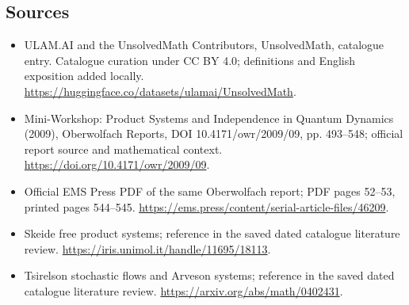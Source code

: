 \documentclass[11pt]{article}
\begin{document}
\subsection{Sources}
\begin{itemize}
\item[\hypertarget{source:statement:1}{S1}] ULAM.AI and the UnsolvedMath Contributors, UnsolvedMath, catalogue entry. Catalogue curation under CC BY 4.0; definitions and English exposition added locally.
\url{https://huggingface.co/datasets/ulamai/UnsolvedMath}.
\item[\hypertarget{source:statement:2}{S2}] Mini-Workshop: Product Systems and Independence in Quantum Dynamics (2009), Oberwolfach Reports, DOI 10.4171/owr/2009/09, pp. 493--548; official report source and mathematical context.
\url{https://doi.org/10.4171/owr/2009/09}.
\item[\hypertarget{source:statement:3}{S3}] Official EMS Press PDF of the same Oberwolfach report; PDF pages 52--53, printed pages 544--545.
\url{https://ems.press/content/serial-article-files/46209}.
\item[\hypertarget{source:statement:4}{S4}] Skeide free product systems; reference in the saved dated catalogue literature review.
\url{https://iris.unimol.it/handle/11695/18113}.
\item[\hypertarget{source:statement:5}{S5}] Tsirelson stochastic flows and Arveson systems; reference in the saved dated catalogue literature review.
\url{https://arxiv.org/abs/math/0402431}.
\end{itemize}
\label{end:statement}
\end{document}
